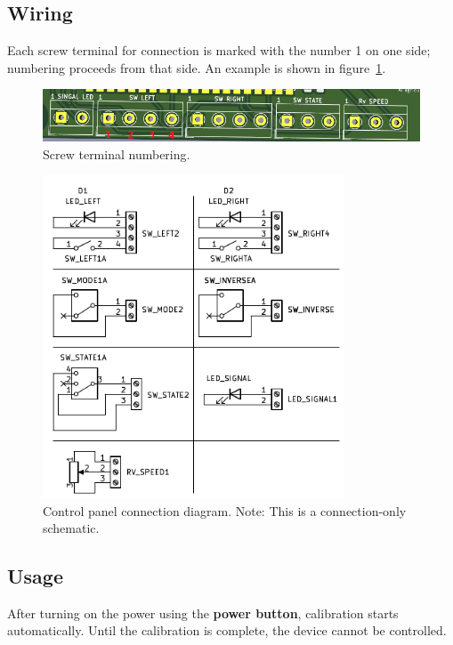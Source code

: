 \subsection{Wiring}
Each screw terminal for connection is marked with the number 1 on one side; numbering proceeds from that side. An example is shown in figure~\ref{fig:control_panel_wiring}.
\begin{figure}[h!]
    \centering
    \includegraphics[width=\textwidth]{images/control_panel_wiring.png}
    \caption{Screw terminal numbering.}
    \label{fig:control_panel_wiring}
\end{figure}
\begin{figure}[h!]
    \centering
    \includegraphics[width=0.8\textwidth]{images/control_panel_schematic.pdf}
    \caption{Control panel connection diagram. Note: This is a connection-only schematic.}
    \label{fig:control_panel_schematic}
\end{figure}

\subsection{Usage}
After turning on the power using the \textbf{power button}, calibration starts automatically. 
Until the calibration is complete, the device cannot be controlled.

